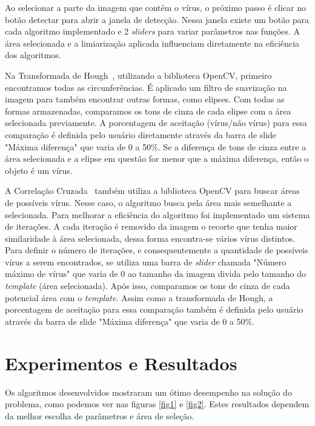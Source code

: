\documentclass[conference, brazil]{IEEEtran}
\begin{document}
Ao selecionar a parte da imagem que contém o vírus, o próximo passo é clicar no botão detectar para abrir a janela de detecção. Nessa janela existe um botão para cada algoritmo implementado e 2 \textit{sliders} para variar parâmetros nas funções. A área selecionada e a limiarização aplicada influenciam diretamente na eficiência dos algoritmos.

Na Transformada de Hough~\cite{HoughCircle}, utilizando a biblioteca OpenCV, primeiro encontramos todas as circunferências. É aplicado um filtro de suavização na imagem para também encontrar outras formas, como elipses. Com todas as formas armazenadas, comparamos os tons de cinza de cada elipse com a área selecionada previamente. A porcentagem de aceitação (vírus/não vírus) para essa comparação é definida pelo usuário diretamente através da barra de slide "Máxima diferença" que varia de 0 a 50\%. Se a diferença de tons de cinza entre a área selecionada e a elipse em questão for menor que a máxima diferença, então o objeto é um vírus.

A Correlação Cruzada~\cite{TemplateMatching} também utiliza a biblioteca OpenCV para buscar áreas de possíveis vírus. Nesse caso, o algoritmo busca pela área mais semelhante a selecionada. Para melhorar a eficiência do algoritmo foi implementado um sistema de iterações. A cada iteração é removido da imagem o recorte que tenha maior similaridade à área selecionada, dessa forma encontra-se vários vírus distintos. Para definir o número de iterações, e consequentemente a quantidade de possíveis vírus a serem encontrados, se utiliza uma barra de \textit{slider} chamada "Número máximo de vírus" que varia de 0 ao tamanho da imagem divida pelo tamanho do \textit{template} (área selecionada). Após isso, comparamos os tons de cinza de cada potencial área com o \textit{template}. Assim como a transformada de Hough, a porcentagem de aceitação para essa comparação também é definida pelo usuário através da barra de slide "Máxima diferença" que varia de 0 a 50\%.


\section{Experimentos e Resultados}
\label{sec:Experimentos e Resultos}
Os algoritmos desenvolvidos mostraram um ótimo desempenho na solução do problema, como podemos ver nas figuras \ref{fig1} e \ref{fig2}. Estes resultados dependem da melhor escolha de parâmetros e área de seleção.
\end{document}

